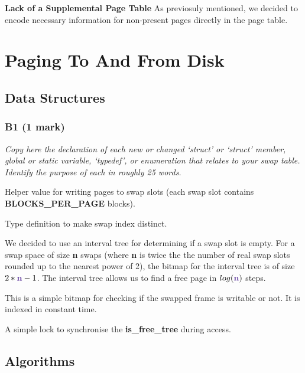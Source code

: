\documentclass{report}
\newcommand{\question}[1]{\textit{#1} \ }
\newcommand{\file}[1]{\textcolor{YellowGreen}{\textbf{#1}}}
\newcommand{\var}[1]{\textcolor{RoyalPurple}{\textbf{#1}}}
\newcommand{\const}[1]{\textcolor{BrickRed}{\textbf{#1}}}
\newcommand{\pintoscode}[4]{}
\newcommand{\pintosfile}[3]{\pintoscode{#1}{#2}{\file{#3}}{#3}}
\begin{document}
				\textbf{Lack of a Supplemental Page Table}
				As previosuly mentioned, we decided to encode necessary information for 
				non-present pages directly in the page table.
				
	\section*{Paging To And From Disk}
		\subsection*{Data Structures}
			\subsubsection*{B1 (1 mark)}
				\question{Copy here the declaration of each new or changed `struct' or
				`struct' member, global or static variable, `typedef', or enumeration 
				that relates to your swap table. Identify the purpose of each in roughly
				25 words.}
				
				\pintosfile{10}{10}{swap.c}
				Helper value for writing pages to swap slots (each swap slot contains 
				\const{BLOCKS\_PER\_PAGE} blocks).

				\pintosfile{9}{9}{swap.h}
					Type definition to make swap index distinct.
				
				\pintosfile{12}{12}{swap.c}
					We decided to use an interval tree for determining if a swap slot is empty.
					For a swap space of size \var{n} swaps (where \var{n} is twice the
					the number of real swap slots rounded up to the nearest power of 2), 
					the bitmap for the interval tree is
					of size $2*\var{n}-1$. The interval tree allows us to find a free page in 
					$log(\var{n})$ steps.
				
				\pintosfile{13}{13}{swap.c}
					This is a simple bitmap for checking if the swapped frame is writable or not. 
					It is indexed in constant time.

				\pintosfile{15}{15}{swap.c}
					A simple lock to synchronise the \var{is\_free\_tree} during access. %
		
		\subsection*{Algorithms}
\end{document}
